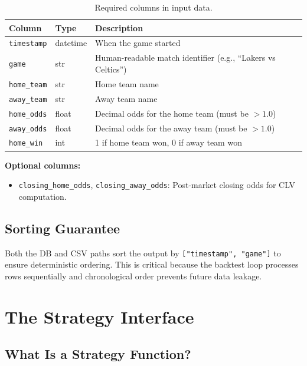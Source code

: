 \documentclass[12pt,a4paper]{report}
\theoremstyle{definition}
\newcommand{\code}[1]{\texttt{#1}}
\begin{document}
\begin{table}[H]
\centering
\caption{Required columns in input data.}
\label{tab:input-columns}
\begin{tabularx}{\textwidth}{llX}
\toprule
\textbf{Column} & \textbf{Type} & \textbf{Description} \\
\midrule
\code{timestamp}   & datetime  & When the game started \\
\code{game}        & str       & Human-readable match identifier (e.g., ``Lakers vs Celtics'') \\
\code{home\_team}  & str       & Home team name \\
\code{away\_team}  & str       & Away team name \\
\code{home\_odds}  & float     & Decimal odds for the home team (must be $> 1.0$) \\
\code{away\_odds}  & float     & Decimal odds for the away team (must be $> 1.0$) \\
\code{home\_win}   & int       & 1 if home team won, 0 if away team won \\
\bottomrule
\end{tabularx}
\end{table}

\textbf{Optional columns:}
\begin{itemize}
    \item \code{closing\_home\_odds}, \code{closing\_away\_odds}: Post-market closing odds for CLV computation.
\end{itemize}

\section{Sorting Guarantee}

Both the DB and CSV paths sort the output by \code{["timestamp", "game"]} to ensure deterministic ordering. This is critical because the backtest loop processes rows sequentially and chronological order prevents future data leakage.


\chapter{The Strategy Interface}
\label{ch:strategy-interface}

\section{What Is a Strategy Function?}
\end{document}
